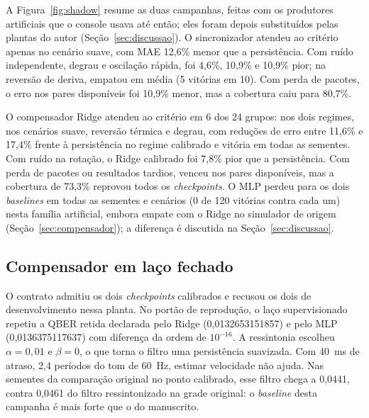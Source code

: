 \documentclass[12pt]{article}
\begin{document}
A Figura~\ref{fig:shadow} resume as duas campanhas, feitas com os produtores
artificiais que o console usava até então; eles foram depois substituídos pelas
plantas do autor (Seção~\ref{sec:discussao}). O sincronizador atendeu ao
critério apenas no cenário suave, com MAE 12,6\% menor que a persistência.
Com ruído independente, degrau e oscilação rápida, foi 4,6\%, 10,9\% e 10,9\%
pior; na reversão de deriva, empatou em média (5 vitórias em 10). Com perda de
pacotes, o erro nos pares disponíveis foi 10,9\% menor, mas a cobertura caiu
para 80,7\%.

O compensador Ridge atendeu ao critério em 6 dos 24 grupos: nos dois regimes,
nos cenários suave, reversão térmica e degrau, com reduções de erro entre
11,6\% e 17,4\% frente à persistência no regime calibrado e vitória em todas as
sementes. Com ruído na rotação, o Ridge calibrado foi 7,8\% pior que a
persistência. Com perda de pacotes ou resultados tardios, venceu nos pares
disponíveis, mas a cobertura de 73,3\% reprovou todos os
\textit{checkpoints}. O MLP perdeu para os dois \textit{baselines} em todas as
sementes e cenários (0 de 120 vitórias contra cada um) nesta família
artificial, embora empate com o Ridge no simulador de origem
(Seção~\ref{sec:compensador}); a diferença é discutida na
Seção~\ref{sec:discussao}.

\subsection{Compensador em laço fechado}

O contrato admitiu os dois \textit{checkpoints} calibrados e recusou os dois de
desenvolvimento nessa planta. No portão de reprodução, o laço supervisionado
repetiu a QBER retida declarada pelo Ridge (0,0132653151857) e pelo MLP
(0,0136375117637) com diferença da ordem de $10^{-16}$. A ressintonia escolheu
$\alpha=0{,}01$ e $\beta=0$, o que torna o filtro uma persistência suavizada. Com
40~ms de atraso, 2,4 períodos do tom de 60~Hz, estimar velocidade não ajuda. Nas
sementes da comparação original no ponto calibrado, esse filtro chega a 0,0441, contra
0,0461 do filtro ressintonizado na grade original: o \textit{baseline} desta
campanha é mais forte que o do manuscrito.
\end{document}

